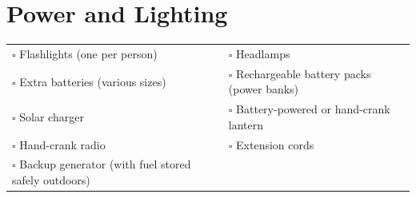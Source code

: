 
\section{Power and Lighting}
\label{sec:power}

\begin{tabular}{p{9cm} p{9cm}}
$\square$ Flashlights (one per person) & $\square$ Headlamps \\ 
$\square$ Extra batteries (various sizes) & $\square$ Rechargeable battery packs (power banks) \\ 
$\square$ Solar charger & $\square$ Battery-powered or hand-crank lantern \\ 
$\square$ Hand-crank radio & $\square$ Extension cords \\ 
$\square$ Backup generator (with fuel stored safely outdoors) &  \\ 
\end{tabular}

